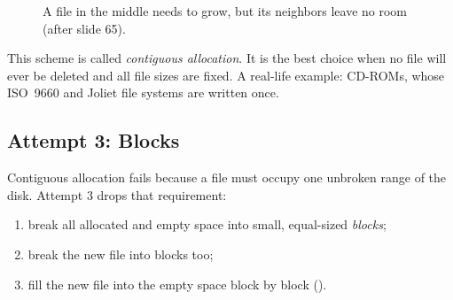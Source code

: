 \begin{figure}[H]
\centering
{}
\caption{A file in the middle needs to grow, but its neighbors leave no room (after slide 65).}
\label{fig:grow}
\end{figure}

This scheme is called \emph{contiguous allocation}. It is the best choice when no file will ever be deleted and all file sizes are fixed. A real-life example: CD-ROMs, whose ISO~9660 and Joliet file systems are written once.

\subsection{Attempt 3: Blocks}

Contiguous allocation fails because a file must occupy one unbroken range of the disk. Attempt 3 drops that requirement:
\begin{enumerate}
  \item break all allocated and empty space into small, equal-sized \emph{blocks};
  \item break the new file into blocks too;
  \item fill the new file into the empty space block by block ().
\end{enumerate}

